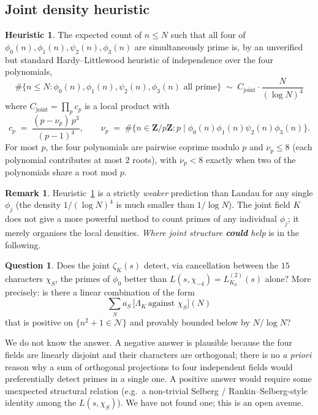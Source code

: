 \documentclass[11pt]{article}
\theoremstyle{definition}
\newtheorem{remark}[theorem]{Remark}
\newtheorem{question}[theorem]{Question}
\newtheorem{heuristic}[theorem]{Heuristic}
\newcommand{\Z}{\mathbf{Z}}
\begin{document}
\subsection{Joint density heuristic}

\begin{heuristic}\label{heu:joint-density}
The expected count of $n \le N$ such that all four of $\phi_0(n), \phi_1(n), \psi_2(n),
\phi_3(n)$ are simultaneously prime is, by an unverified but standard Hardy--Littlewood
heuristic of independence over the four polynomials,
\[
  \#\bigl\{n\le N : \phi_0(n), \phi_1(n), \psi_2(n), \phi_3(n) \text{ all prime}\bigr\}
   \;\sim\; C_{\mathrm{joint}} \cdot \frac{N}{(\log N)^4}
\]
where $C_{\mathrm{joint}} = \prod_{p} c_p$ is a local product with
\[
   c_p \;=\; \frac{(p - \nu_p)\, p^3}{(p-1)^4}, \qquad
   \nu_p \;=\; \#\{n \in \Z/p\Z : p\mid \phi_0(n)\phi_1(n)\psi_2(n)\phi_3(n)\}.
\]
For most $p$, the four polynomials are pairwise coprime modulo $p$ and
$\nu_p \le 8$ (each polynomial contributes at most $2$ roots), with $\nu_p < 8$ exactly
when two of the polynomials share a root mod $p$.
\end{heuristic}

\begin{remark}\label{rmk:joint-not-stronger}
Heuristic~\ref{heu:joint-density} is a strictly \emph{weaker} prediction than Landau for
any single $\phi_j$ (the density $1/(\log N)^4$ is much smaller than $1/\log N$). The
joint field $K$ does not give a more powerful method to count primes of any individual
$\phi_j$; it merely organises the local densities. \emph{Where joint structure
\textbf{could} help} is in the following.
\end{remark}

\begin{question}\label{q:joint-detection}
Does the joint $\zeta_K(s)$ detect, via cancellation between the $15$ characters $\chi_S$,
the primes of $\phi_0$ better than $L(s,\chi_{-4}) = L_{K_0}^{(2)}(s)$ alone? More
precisely: is there a linear combination of the form
\[
   \sum_{S} a_S\,\bigl[\Lambda_K\,\text{against }\chi_S\bigr](N)
\]
that is positive on $\{n^2 + 1 \in \mathcal{N}\}$ and provably bounded below by
$N / \log N$?
\end{question}

We do not know the answer. A negative answer is plausible because the four
fields are linearly disjoint and their characters are orthogonal; there is no \emph{a priori}
reason why a sum of orthogonal projections to four independent fields would
preferentially detect primes in a single one. A positive answer would require some
unexpected structural relation (e.g.\ a non-trivial Selberg / Rankin--Selberg-style
identity among the $L(s,\chi_S)$). We have not found one; this is an open avenue.
\end{document}
